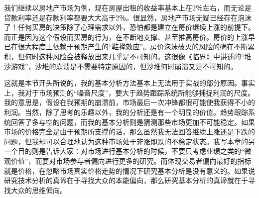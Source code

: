 我们继续以房地产市场为例，现在房屋出租的收益率基本上在2％左右，而无论是贷款利率还是存款利率都要大大高于2％。很显然，房地产市场无疑已经存在泡沫了！任何买房的决策除了心理需求以外，恐怕都是建立在房价继续上涨的前提下。而正是因为这个假设而买房的行为，在不断地支撑、甚至推高房价。房价的上涨早已在很大程度上依赖于预期产生的“鞋襻效应”。房价泡沫破灭的风险的确在不断累积，但何时这种风险会被释放出来几乎是不可知的。这很像《临界》中讲述的“堆沙游戏”，沙堆的崩溃是不需要特定原因的，但沙堆何时崩溃又是不可知的。

这就是本节开头所说的，我的基本分析方法基本上无法用于实战的部分原因。事实上，我对于市场预测的“噪音尺度”，要大于趋势跟踪系统所能够捕捉利润的尺度。我的意思是，假设在我预期的崩溃前，市场最后一次冲锋都很可能使我获得不小的利润。当然，除了思考的乐趣以外，我的分析还是有一个明显的价值。趋势跟踪系统回答了多与空的问题，而我的基本分析则是猜测那些市场更加不可能稳定。如果市场的价格完全是由于预期所支撑的话，那么虽然我无法回答继续上涨还是下跌的问题，但我却可以合理地认为这种市场处于非涨即跌的不稳定状态。我写本章的另一个目的则是告诉大家：对市场进行基本分析的时候，不要只考虑业绩之类的“微观价值”，而要对市场参与者偏向进行更多的研究。而体现交易者偏向最好的指标就是价格，在忽略市场真实价格走势的情况下研究基本分析是没有意义的。如果说研究技术分析的真谛在于寻找大众的本能偏向，那么研究基本分析的真谛就在于寻找大众的思维偏向。

\clearpage
